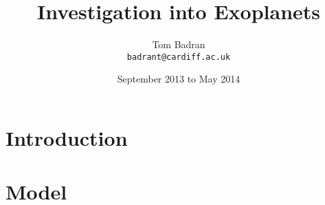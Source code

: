 \documentclass[10pt,a4paper]{article}
\title{Investigation into Exoplanets}
\author{Tom Badran \\ \texttt{badrant@cardiff.ac.uk}}
\date{September 2013 to May 2014}
\numberwithin{equation}{section}
\begin{document}
\maketitle

\abstract



\section{Introduction}



\section{Model}


\printbibliography
\end{document}
